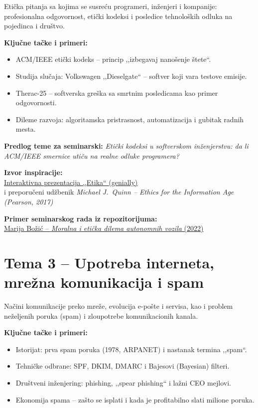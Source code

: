 \documentclass[12pt,a4paper]{article}
\begin{document}
Etička pitanja sa kojima se susreću programeri, inženjeri i kompanije: profesionalna
odgovornost, etički kodeksi i posledice tehnoloških odluka na pojedinca i društvo.

\textbf{Ključne tačke i primeri:}
\begin{itemize}
    \item ACM/IEEE etički kodeks -- princip ,,izbegavaj nanošenje štete``.
    \item Studija slučaja: Volkswagen ,,Dieselgate`` -- softver koji vara testove
          emisije.
    \item Therac-25 -- softverska greška sa smrtnim posledicama kao primer odgovornosti.
    \item Dileme razvoja: algoritamska pristrasnost, automatizacija i gubitak radnih
          mesta.
\end{itemize}

\textbf{Predlog teme za seminarski:}
\emph{Etički kodeksi u softverskom inženjerstvu: da li ACM/IEEE smernice utiču na
realne odluke programera?}

\textbf{Izvor inspiracije:}\\
\href{https://view.genial.ly/62304dfe2abb7a00182329b0/interactive-content-etika}%
{Interaktivna prezentacija ,,Etika`` (genially)}\\
i preporučeni udžbenik \emph{Michael J.\ Quinn -- Ethics for the Information Age
(Pearson, 2017)}

\textbf{Primer seminarskog rada iz repozitorijuma:}\\
\href{https://github.com/sanastojanovic/RID/blob/main/rid_2022_seminarski/mi18241_Bo\%C5\%BEi\%C4\%87_Marija/2_predavanje/seminarski_rad.pdf}%
{Marija Božić -- \emph{Moralna i etička dilema autonomnih vozila} (2022)}

\section{Tema 3 -- Upotreba interneta, mrežna komunikacija i spam}

Načini komunikacije preko mreže, evolucija e-pošte i servisa, kao i problem neželjenih
poruka (spam) i zloupotrebe komunikacionih kanala.

\textbf{Ključne tačke i primeri:}
\begin{itemize}
    \item Istorijat: prva spam poruka (1978, ARPANET) i nastanak termina ,,spam``.
    \item Tehničke odbrane: SPF, DKIM, DMARC i Bajesovi (Bayesian) filteri.
    \item Društveni inženjering: phishing, ,,spear phishing`` i lažni CEO mejlovi.
    \item Ekonomija spama -- zašto se isplati i kada je profitabilno slati milione
          poruka.
\end{itemize}
\end{document}
